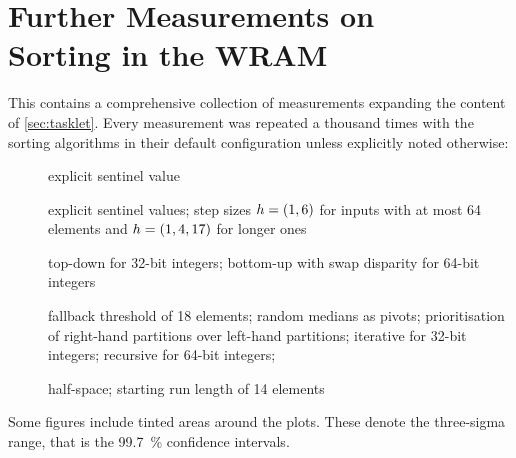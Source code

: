 \chapter[Further Measurements on Sorting in the \texorpdfstring{\abb{WRAM}}{WRAM}]{Further Measurements on \\ Sorting in the \acs*{WRAM}}
\label{apx:tasklet}

This  contains a comprehensive collection of measurements expanding the content of \cref{sec:tasklet}.
Every measurement was repeated a thousand times with the sorting algorithms in their default configuration unless explicitly noted otherwise:
\begin{description}
	\item[\IS{}]
	explicit sentinel value

	\item[\ShS{}]
	explicit sentinel values;
	step sizes \(h = \lparen1, 6\rparen\) for inputs with at most 64 elements and \(h = \lparen1, 4, 17\rparen\) for longer ones

	\item[\HS{}]
	top-down for 32-bit integers;
	bottom-up with swap disparity for 64-bit integers

	\item[\QS{}]
	fallback threshold of 18 elements;
	random medians as pivots;
	prioritisation of right-hand partitions over left-hand partitions;
	iterative for 32-bit integers;
	recursive for 64-bit integers;

	\item[\MS{}]
	half-space;
	starting run length of 14 elements
\end{description}
Some figures include tinted areas around the plots.
These denote the three-sigma range, that is the \qty{99.7}{\percent} confidence intervals.










